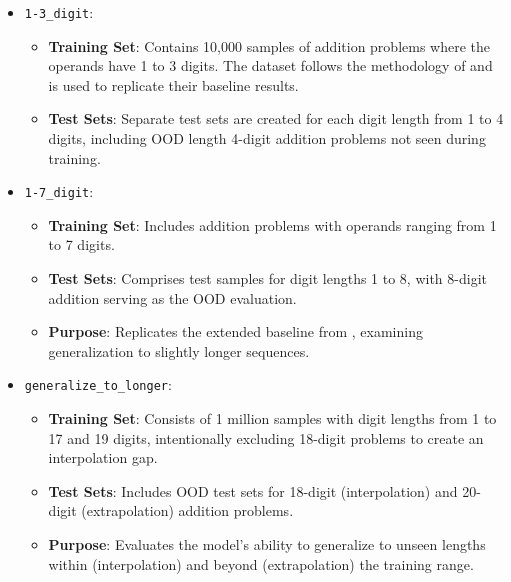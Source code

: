 \begin{itemize}
    \item \texttt{1-3\_digit}:
          \begin{itemize}
              \item \textbf{Training Set}: Contains 10,000 samples of addition problems where the operands have 1 to 3 digits. The dataset follows the methodology of \cite{lee_teaching_2023} and is used to replicate their baseline results.
              \item \textbf{Test Sets}: Separate test sets are created for each digit length from 1 to 4 digits, including OOD length 4-digit addition problems not seen during training.
          \end{itemize}

    \item \texttt{1-7\_digit}:
          \begin{itemize}
              \item \textbf{Training Set}: Includes addition problems with operands ranging from 1 to 7 digits.
              \item \textbf{Test Sets}: Comprises test samples for digit lengths 1 to 8, with 8-digit addition serving as the OOD evaluation.
              \item \textbf{Purpose}: Replicates the extended baseline from \cite{lee_teaching_2023}, examining generalization to slightly longer sequences.
          \end{itemize}

    \item \texttt{generalize\_to\_longer}:
          \begin{itemize}
              \item \textbf{Training Set}: Consists of 1 million samples with digit lengths from 1 to 17 and 19 digits, intentionally excluding 18-digit problems to create an interpolation gap.
              \item \textbf{Test Sets}: Includes OOD test sets for 18-digit (interpolation) and 20-digit (extrapolation) addition problems.
              \item \textbf{Purpose}: Evaluates the model's ability to generalize to unseen lengths within (interpolation) and beyond (extrapolation) the training range.
          \end{itemize}


\end{itemize}
